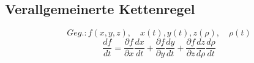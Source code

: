 \subsection{Verallgemeinerte Kettenregel}
    \vspace{-0.75em}
    $$
        Geg.: f(x,y,z),\quad x(t), y(t), z(\rho),\quad \rho(t)
    $$
    \vspace{-0.6em}
    $$
        \frac{df}{dt} = \frac{\partial f}{\partial x}   \frac{dx}{dt} + \frac{\partial f}{\partial y} \frac{dy}{dt} + \frac{\partial f}{\partial z} \frac{dz}{d\rho} \frac{d\rho}{dt}
    $$
